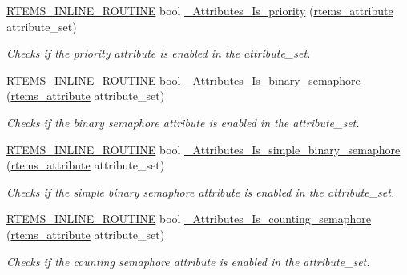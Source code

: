 \begin{DoxyCompactItemize}
\mbox{\hyperlink{group__RTEMSScoreBaseDefs_gac216239df231d5dbd15e3520b0b9313f}{R\+T\+E\+M\+S\+\_\+\+I\+N\+L\+I\+N\+E\+\_\+\+R\+O\+U\+T\+I\+NE}} bool \mbox{\hyperlink{group__ClassicAttributesImpl_ga54cc0d8f84115e7e29a83d3400398833}{\+\_\+\+Attributes\+\_\+\+Is\+\_\+priority}} (\mbox{\hyperlink{group__ClassicAttributes_gaea40313cf78ed843e09c4315d0a10f79}{rtems\+\_\+attribute}} attribute\+\_\+set)
\begin{DoxyCompactList}\small\item\em Checks if the priority attribute is enabled in the attribute\+\_\+set. \end{DoxyCompactList}\item 
\mbox{\hyperlink{group__RTEMSScoreBaseDefs_gac216239df231d5dbd15e3520b0b9313f}{R\+T\+E\+M\+S\+\_\+\+I\+N\+L\+I\+N\+E\+\_\+\+R\+O\+U\+T\+I\+NE}} bool \mbox{\hyperlink{group__ClassicAttributesImpl_gae1c4c3dcfbabfb1381aae7267389b11e}{\+\_\+\+Attributes\+\_\+\+Is\+\_\+binary\+\_\+semaphore}} (\mbox{\hyperlink{group__ClassicAttributes_gaea40313cf78ed843e09c4315d0a10f79}{rtems\+\_\+attribute}} attribute\+\_\+set)
\begin{DoxyCompactList}\small\item\em Checks if the binary semaphore attribute is enabled in the attribute\+\_\+set. \end{DoxyCompactList}\item 
\mbox{\hyperlink{group__RTEMSScoreBaseDefs_gac216239df231d5dbd15e3520b0b9313f}{R\+T\+E\+M\+S\+\_\+\+I\+N\+L\+I\+N\+E\+\_\+\+R\+O\+U\+T\+I\+NE}} bool \mbox{\hyperlink{group__ClassicAttributesImpl_ga46243ea367a4339919d9100d3f7b620b}{\+\_\+\+Attributes\+\_\+\+Is\+\_\+simple\+\_\+binary\+\_\+semaphore}} (\mbox{\hyperlink{group__ClassicAttributes_gaea40313cf78ed843e09c4315d0a10f79}{rtems\+\_\+attribute}} attribute\+\_\+set)
\begin{DoxyCompactList}\small\item\em Checks if the simple binary semaphore attribute is enabled in the attribute\+\_\+set. \end{DoxyCompactList}\item 
\mbox{\hyperlink{group__RTEMSScoreBaseDefs_gac216239df231d5dbd15e3520b0b9313f}{R\+T\+E\+M\+S\+\_\+\+I\+N\+L\+I\+N\+E\+\_\+\+R\+O\+U\+T\+I\+NE}} bool \mbox{\hyperlink{group__ClassicAttributesImpl_gafcc4fe0234a43ef490cebb3f45fac48d}{\+\_\+\+Attributes\+\_\+\+Is\+\_\+counting\+\_\+semaphore}} (\mbox{\hyperlink{group__ClassicAttributes_gaea40313cf78ed843e09c4315d0a10f79}{rtems\+\_\+attribute}} attribute\+\_\+set)
\begin{DoxyCompactList}\small\item\em Checks if the counting semaphore attribute is enabled in the attribute\+\_\+set. \end{DoxyCompactList}\item 

\end{DoxyCompactItemize}
